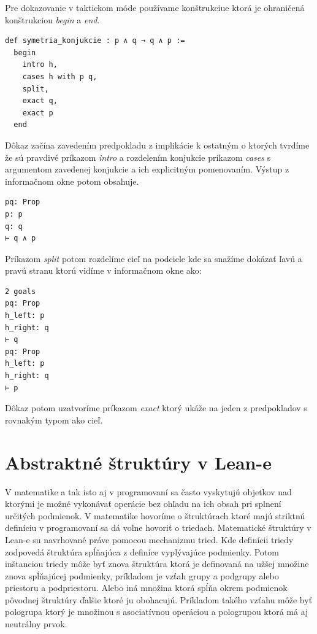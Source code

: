 \documentclass[a4paper,10pt,oneside]{report}%
\begin{document}
Pre dokazovanie v taktickom móde používame konštrukciue ktorá je ohraničená
    konštrukciou \emph{begin} a \emph{end}.

\begin{lstlisting}
def symetria_konjukcie : p ∧ q → q ∧ p :=
  begin
    intro h,
    cases h with p q,
    split,
    exact q,
    exact p
  end
\end{lstlisting}

Dôkaz začína zavedením predpokladu z implikácie k ostatným o ktorých tvrdíme že
    sú pravdivé príkazom \emph{intro} a rozdelením konjukcie príkazom \emph{cases}
    s argumentom zavedenej konjukcie a ich explicitným pomenovaním.
Výstup z informačnom okne potom obsahuje.

\begin{lstlisting}
pq: Prop
p: p
q: q
⊢ q ∧ p
\end{lstlisting}

Príkazom \emph{split} potom rozdelíme cieľ na podciele kde sa snažíme dokázať
ľavú a pravú stranu ktorú vidíme v informačnom okne ako:

\begin{lstlisting}
2 goals
pq: Prop
h_left: p
h_right: q
⊢ q
pq: Prop
h_left: p
h_right: q
⊢ p
\end{lstlisting}

Dôkaz potom uzatvoríme príkazom \emph{exact} ktorý ukáže na jeden z predpokladov
    s rovnakým typom ako cieľ.

\section{Abstraktné štruktúry v Lean-e}
    V matematike a tak isto aj v programovaní sa často vyskytujú objetkov
nad ktorými je možné vykonávať operácie bez ohľadu na ich obsah pri splnení
určitých podmienok.
    V matematike hovoríme o štruktúrach ktoré majú striktnú definíciu v programovaní
sa dá voľne hovoriť o triedach.
    Matematické štruktúry v Lean-e su navrhované práve pomocou mechanizmu tried.
    Kde definícii triedy zodpovedá štruktúra spĺňajúca z definíce vyplývajúce podmienky.
    Potom inštanciou triedy môže byť znova štruktúra ktorá je definovaná na užšej množine
znova spĺňajúcej podmienky, príkladom je vzťah grupy a podgrupy alebo
priestoru a podpriestoru.
    Alebo iná množina ktorá spĺňa okrem podmienok pôvodnej štruktúry ďalšie ktoré ju
obohacujú.
    Príkladom takého vzťahu môže byť pologrupa ktorý je množinou s asociatívnou operáciou
a pologrupou ktorá má aj neutrálny prvok.
\end{document}
